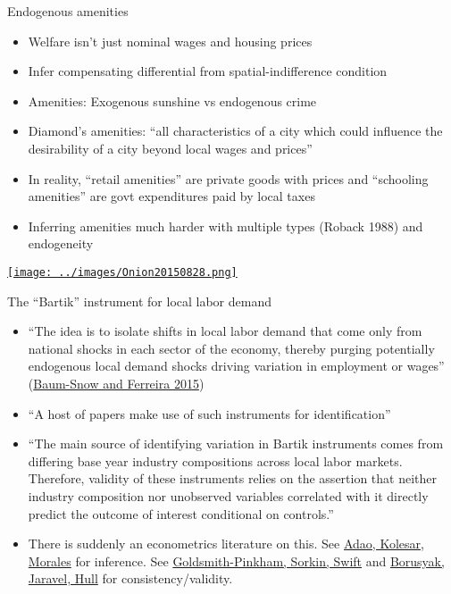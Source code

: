 \documentclass[10pt,notes=hide]{beamer}
\begin{document}
\begin{frame}{Endogenous amenities}
\begin{itemize}
	\item Welfare isn't just nominal wages and housing prices
	\item Infer compensating differential from spatial-indifference condition
	\item Amenities: Exogenous sunshine vs endogenous crime
	\item Diamond's amenities: ``all characteristics of a city which could influence the desirability of a city beyond local wages and prices''
	\item In reality, ``retail amenities'' are private goods with prices and ``schooling amenities'' are govt expenditures paid by local taxes
	\item Inferring amenities much harder with multiple types (Roback 1988) and endogeneity
\end{itemize}
\vspace{4mm}
\href{https://local.theonion.com/neighborhood-starting-to-get-too-safe-for-family-to-aff-1819578182}{\texttt{[image: ../images/Onion20150828.png]}}
\end{frame}
\begin{frame}{The ``Bartik'' instrument for local labor demand}
\begin{itemize}
	\item {\small ``The idea is to isolate shifts in local labor demand that come only from national shocks in each sector of the economy, thereby purging potentially endogenous local demand shocks driving variation in employment or wages'' (\href{https://ideas.repec.org/h/eee/regchp/5-3.html}{Baum-Snow and Ferreira 2015})}
	\item ``A host of papers make use of such instruments for identification''
	\item {\small ``The main source of identifying variation in Bartik instruments comes from differing base year industry compositions across local labor markets. Therefore, validity of these instruments relies on the assertion that neither industry composition nor unobserved variables correlated with it directly predict the outcome of interest conditional on controls.''}
	\item There is suddenly an econometrics literature on this. 
	See \href{https://academic.oup.com/qje/article-abstract/134/4/1949/5552146}{Adao, Kolesar, Morales} for inference.
	See \href{https://www.aeaweb.org/articles?id=10.1257\%2Faer.20181047}{Goldsmith-Pinkham, Sorkin, Swift} and \href{http://about.peterhull.net/wp}{Borusyak, Jaravel, Hull} for consistency/validity.
\end{itemize}
\end{frame}
\end{document}
